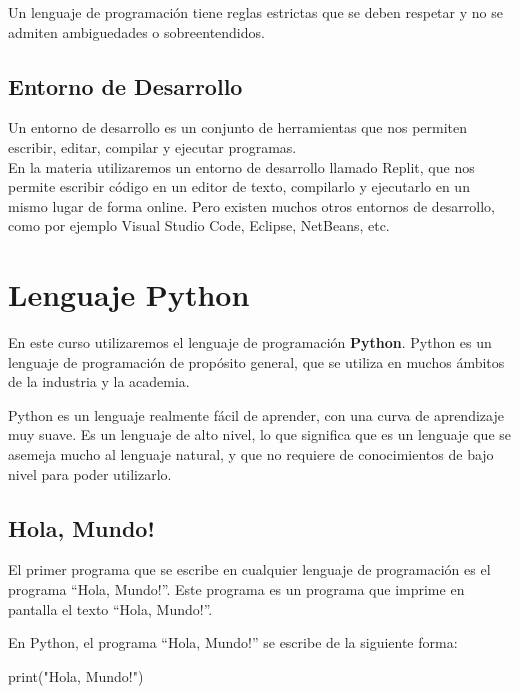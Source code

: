 \documentclass[
  letterpaper,
  DIV=11,
  numbers=noendperiod]{scrreprt}
\newenvironment{Shaded}{\begin{snugshade}}{\end{snugshade}}
\newcommand{\BuiltInTok}[1]{\textcolor[rgb]{0.00,0.23,0.31}{#1}}
\newcommand{\NormalTok}[1]{\textcolor[rgb]{0.00,0.23,0.31}{#1}}
\newcommand{\StringTok}[1]{\textcolor[rgb]{0.13,0.47,0.30}{#1}}
\begin{document}
Un lenguaje de programación tiene reglas estrictas que se deben respetar
y no se admiten ambiguedades o sobreentendidos.

\subsection{Entorno de Desarrollo}\label{entorno-de-desarrollo}

Un entorno de desarrollo es un conjunto de herramientas que nos permiten
escribir, editar, compilar y ejecutar programas.\\

En la materia utilizaremos un entorno de desarrollo llamado Replit, que
nos permite escribir código en un editor de texto, compilarlo y
ejecutarlo en un mismo lugar de forma online. Pero existen muchos otros
entornos de desarrollo, como por ejemplo Visual Studio Code, Eclipse,
NetBeans, etc.

\section{Lenguaje Python}\label{lenguaje-python}

En este curso utilizaremos el lenguaje de programación \textbf{Python}.
Python es un lenguaje de programación de propósito general, que se
utiliza en muchos ámbitos de la industria y la academia.

Python es un lenguaje realmente fácil de aprender, con una curva de
aprendizaje muy suave. Es un lenguaje de alto nivel, lo que significa
que es un lenguaje que se asemeja mucho al lenguaje natural, y que no
requiere de conocimientos de bajo nivel para poder utilizarlo.

\subsection{Hola, Mundo!}\label{hola-mundo}

El primer programa que se escribe en cualquier lenguaje de programación
es el programa ``Hola, Mundo!''. Este programa es un programa que
imprime en pantalla el texto ``Hola, Mundo!''.

En Python, el programa ``Hola, Mundo!'' se escribe de la siguiente
forma:

\begin{Shaded}
\begin{Highlighting}[]
\BuiltInTok{print}\NormalTok{(}\StringTok{"Hola, Mundo!"}\NormalTok{)}
\end{Highlighting}
\end{Shaded}
\end{document}

